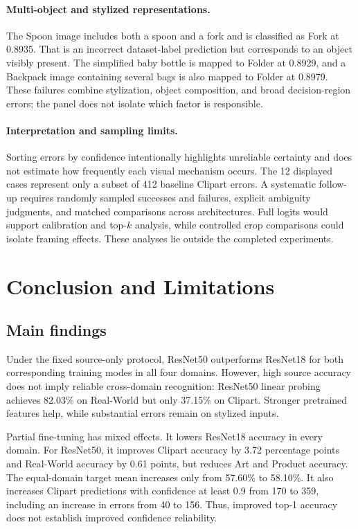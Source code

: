 \documentclass[10pt,a4paper]{article}
\begin{document}
\paragraph{Multi-object and stylized representations.}
The Spoon image includes both a spoon and a fork and is classified as Fork at 0.8935. That is an incorrect dataset-label prediction but corresponds to an object visibly present. The simplified baby bottle is mapped to Folder at 0.8929, and a Backpack image containing several bags is also mapped to Folder at 0.8979. These failures combine stylization, object composition, and broad decision-region errors; the panel does not isolate which factor is responsible.

\paragraph{Interpretation and sampling limits.}
Sorting errors by confidence intentionally highlights unreliable certainty and does not estimate how frequently each visual mechanism occurs. The 12 displayed cases represent only a subset of 412 baseline Clipart errors. A systematic follow-up requires randomly sampled successes and failures, explicit ambiguity judgments, and matched comparisons across architectures. Full logits would support calibration and top-$k$ analysis, while controlled crop comparisons could isolate framing effects. These analyses lie outside the completed experiments.


\clearpage
\section{Conclusion and Limitations}
\subsection{Main findings}
Under the fixed source-only protocol, ResNet50 outperforms ResNet18 for both corresponding training modes in all four domains. However, high source accuracy does not imply reliable cross-domain recognition: ResNet50 linear probing achieves 82.03\% on Real-World but only 37.15\% on Clipart. Stronger pretrained features help, while substantial errors remain on stylized inputs.

Partial fine-tuning has mixed effects. It lowers ResNet18 accuracy in every domain. For ResNet50, it improves Clipart accuracy by 3.72 percentage points and Real-World accuracy by 0.61 points, but reduces Art and Product accuracy. The equal-domain target mean increases only from 57.60\% to 58.10\%. It also increases Clipart predictions with confidence at least 0.9 from 170 to 359, including an increase in errors from 40 to 156. Thus, improved top-1 accuracy does not establish improved confidence reliability.
\end{document}
